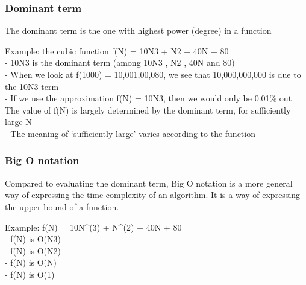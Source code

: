 \documentclass{article}
\begin{document}
\subsubsection{Dominant term}

The dominant term is the one with highest power (degree) in a function

Example: the cubic function f(N) = 10N3 + N2 + 40N + 80 \\

    - 10N3 is the dominant term (among 10N3 , N2 , 40N and 80) \\
    - When we look at f(1000) = 10,001,00,080, we see that 10,000,000,000 is due to the 10N3 term \\
    - If we use the approximation f(N) = 10N3, then we would only be 0.01\% out \\

The value of f(N) is largely determined by the dominant term, for sufficiently large N \\
    - The meaning of ‘sufficiently large’ varies according to the function \\


\subsubsection{Big O notation}

Compared to evaluating the dominant term, Big O notation is a more general way of expressing the time complexity of an algorithm. It is a way of expressing the upper bound of a function.

Example: f(N) = 10N^(3) + N^(2) + 40N + 80 \\
    - f(N) is O(N3) \\
    - f(N) is O(N2) \\
    - f(N) is O(N) \\
    - f(N) is O(1) \\
\end{document}
